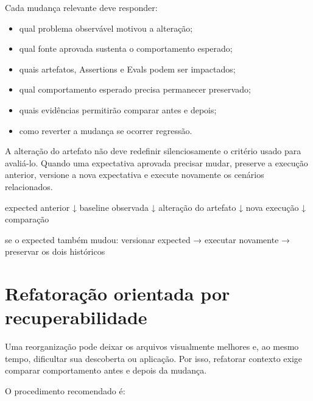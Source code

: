 \documentclass[
  10pt,
  a4paper,
  oneside]{book}
\newenvironment{Shaded}{}{}
\newcommand{\NormalTok}[1]{#1}
\providecommand{\tightlist}{%
  \setlength{\itemsep}{0pt}\setlength{\parskip}{0pt}}
\renewenvironment{Shaded}{\begin{snugshade}}{\end{snugshade}}%
\begin{document}
Cada mudança relevante deve responder:

\begin{itemize}
\tightlist
\item
  qual problema observável motivou a alteração;
\item
  qual fonte aprovada sustenta o comportamento esperado;
\item
  quais artefatos, Assertions e Evals podem ser impactados;
\item
  qual comportamento esperado precisa permanecer preservado;
\item
  quais evidências permitirão comparar antes e depois;
\item
  como reverter a mudança se ocorrer regressão.
\end{itemize}

A alteração do artefato não deve redefinir silenciosamente o critério
usado para avaliá-lo. Quando uma expectativa aprovada precisar mudar,
preserve a execução anterior, versione a nova expectativa e execute
novamente os cenários relacionados.

\begin{Shaded}
\begin{Highlighting}[]
\NormalTok{expected anterior}
\NormalTok{        ↓}
\NormalTok{baseline observada}
\NormalTok{        ↓}
\NormalTok{alteração do artefato}
\NormalTok{        ↓}
\NormalTok{nova execução}
\NormalTok{        ↓}
\NormalTok{comparação}

\NormalTok{se o expected também mudou:}
\NormalTok{versionar expected}
\NormalTok{→ executar novamente}
\NormalTok{→ preservar os dois históricos}
\end{Highlighting}
\end{Shaded}

\hypertarget{refatorauxe7uxe3o-orientada-por-recuperabilidade}{%
\section{Refatoração orientada por
recuperabilidade}\label{refatorauxe7uxe3o-orientada-por-recuperabilidade}}

Uma reorganização pode deixar os arquivos visualmente melhores e, ao
mesmo tempo, dificultar sua descoberta ou aplicação. Por isso, refatorar
contexto exige comparar comportamento antes e depois da mudança.

O procedimento recomendado é:
\end{document}
